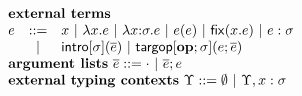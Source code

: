 $\begin{array}{lcl}%
\multicolumn{3}{l}{\textbf{external terms}}\\
e & ::= & \multicolumn{1}{l}{x ~|~ \eanalam{x}{e} ~|~ \elam{\st}{x}{e} ~|~ \eap{e}{e} ~|~ \efix{x}{e} ~|~ \easc{e}{\st}}\\
& ~|~ &\eintro{\st}{\es} ~|~ \etarg{\opname{op}}{\st}{e}{\es}\\
\multicolumn{3}{l}{\textbf{argument lists}~\es ::= \cdot ~|~ \es; e}\\
\multicolumn{3}{l}{\textbf{external typing contexts}~\Upsilon ::=  \emptyset ~|~ \Upsilon, x : \st} %
\end{array}%
$
